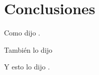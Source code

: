 \section{Conclusiones}

\lipsum[10] Como dijo \cite{ArgosyMedicalAnimation}.

\lipsum[11] También lo dijo \parencite{article-example,biber,biblatex}

\lipsum[12] Y esto lo dijo \textcite{guia1}.